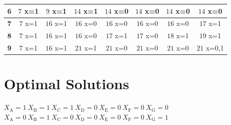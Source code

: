 \documentclass{article}
\begin{document}
\begin{center}
\begin{adjustbox}{max width=\textwidth}
\begin{tabular}{|c||c|c|c|c|c|c|c|}
        \hline
        \textbf{6}& \cellcolor[HTML]{3FFC45}$7$ x={1} & \cellcolor[HTML]{3FFC45}$9$ x={1} & \cellcolor[HTML]{3FFC45}$14$ x={1} & \cellcolor[HTML]{FC3F3F}$14$ x={0}& \cellcolor[HTML]{FC3F3F}$14$ x={0}& \cellcolor[HTML]{FC3F3F}$14$ x={0}& \cellcolor[HTML]{FC3F3F}$14$ x={0}\\
        \hline
        \textbf{7}& \cellcolor[HTML]{3FFC45}$7$ x={1} & \cellcolor[HTML]{3FFC45}$16$ x={1} & \cellcolor[HTML]{FC3F3F}$16$ x={0}& \cellcolor[HTML]{FC3F3F}$16$ x={0}& \cellcolor[HTML]{FC3F3F}$16$ x={0}& \cellcolor[HTML]{FC3F3F}$16$ x={0}& \cellcolor[HTML]{3FFC45}$17$ x={1} \\
        \hline
        \textbf{8}& \cellcolor[HTML]{3FFC45}$7$ x={1} & \cellcolor[HTML]{3FFC45}$16$ x={1} & \cellcolor[HTML]{FC3F3F}$16$ x={0}& \cellcolor[HTML]{3FFC45}$17$ x={1} & \cellcolor[HTML]{FC3F3F}$17$ x={0}& \cellcolor[HTML]{3FFC45}$18$ x={1} & \cellcolor[HTML]{3FFC45}$19$ x={1} \\
        \hline
        \textbf{9}& \cellcolor[HTML]{3FFC45}$7$ x={1} & \cellcolor[HTML]{3FFC45}$16$ x={1} & \cellcolor[HTML]{3FFC45}$21$ x={1} & \cellcolor[HTML]{FC3F3F}$21$ x={0}& \cellcolor[HTML]{FC3F3F}$21$ x={0}& \cellcolor[HTML]{FC3F3F}$21$ x={0}& \cellcolor[HTML]{3F62FC}$21$ x={0,1}\\
        \hline
    \end{tabular}
\end{adjustbox}


\end{center}


\section{Optimal Solutions}
$X_{\text{A}}=1 \:X_{\text{B}}=1 \:X_{\text{C}}=1 \:X_{\text{D}}=0 \:X_{\text{E}}=0 \:X_{\text{F}}=0 \:X_{\text{G}}=0 \:$ \newline
$X_{\text{A}}=0 \:X_{\text{B}}=1 \:X_{\text{C}}=0 \:X_{\text{D}}=0 \:X_{\text{E}}=0 \:X_{\text{F}}=0 \:X_{\text{G}}=1 \:$ \newline
\end{document}
